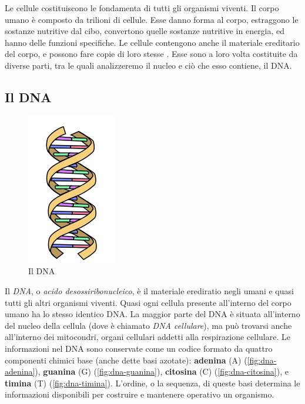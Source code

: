 Le cellule costituiscono le fondamenta di tutti gli organismi viventi. Il corpo umano è composto da trilioni di cellule. Esse danno forma al corpo, estraggono le sostanze nutritive dal cibo, convertono quelle sostanze nutritive in energia, ed hanno delle funzioni specifiche. Le cellule contengono anche il materiale ereditario del corpo, e possono fare copie di loro stesse \cite{whatisacell:online}. Esse sono a loro volta costituite da diverse parti, tra le quali analizzeremo il nucleo e ciò che esso contiene, il DNA.

\subsection{Il DNA}
\label{chap:intro-biology-dna}

\begin{figure}
    \centering
    \includegraphics[width=0.25 \textwidth]{./Images/1_dna.png}
    \caption{Il DNA}
    \label{fig:dna}
\end{figure}


Il \textit{DNA}, o \textit{acido desossiribonucleico}, è il materiale erediratio negli umani e quasi tutti gli altri organismi viventi. Quasi ogni cellula presente all'interno del corpo umano ha lo stesso identico DNA. La maggior parte del DNA è situata all'interno del nucleo della cellula (dove è chiamato \textit{DNA cellulare}), ma può trovarsi anche all'interno dei mitocondri, organi cellulari addetti alla respirazione cellulare. Le informazioni nel DNA sono conservate come un codice formato da quattro componenti chimici base (anche dette basi azotate): \textbf{adenina} (A) (\autoref{fig:dna-adenina}), \textbf{guanina} (G) (\autoref{fig:dna-guanina}), \textbf{citosina} (C) (\autoref{fig:dna-citosina}), e \textbf{timina} (T) (\autoref{fig:dna-timina}). L'ordine, o la sequenza, di queste basi determina le informazioni disponibili per costruire e mantenere operativo un organismo.

